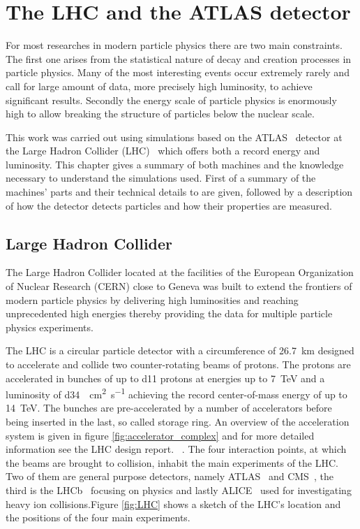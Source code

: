 

\chapter{The LHC and the ATLAS detector}
\label{lhc_atlas}


For most researches in modern particle physics there are two main constraints. The first one arises from the statistical nature of decay and creation processes in particle physics. Many of the most interesting events occur extremely rarely and call for large amount of data, more precisely high luminosity, to achieve significant results. Secondly the energy scale of particle physics is enormously high to allow breaking the structure of particles below the nuclear scale. 

This work was carried out using simulations based on the ATLAS~\cite{atlas} detector at the Large Hadron Collider (LHC)~\cite{lhc_machine} which offers both a record energy and luminosity. This chapter gives a summary of both machines and the knowledge necessary to understand the simulations used. First of a summary of the machines' parts and their technical details to are given, followed by a description of how the detector detects particles and how their properties are measured.

\section{Large Hadron Collider}

The Large Hadron Collider located at the facilities of the European Organization of Nuclear Research (CERN) close to Geneva was built to extend the frontiers of modern particle physics by delivering high luminosities and reaching unprecedented high energies thereby providing the data for multiple particle physics experiments.

The LHC is a circular particle detector with a circumference of \SI{26.7}{\kilo \metre} designed to  accelerate and collide two counter-rotating beams of protons. The protons are accelerated in bunches of up to \num{d11} protons at  energies up to \SI{7}{\tera \electronvolt} and a luminosity of \SI{d34}{\per\square\cm \per\s} achieving the record center-of-mass energy of up to \SI{14}{\tera \electronvolt}. The bunches are pre-accelerated by a number of accelerators before being inserted in the last, so called storage ring. An overview of the acceleration system is given in figure \ref{fig:accelerator_complex} and for more detailed information see the LHC design report. ~\cite{lhc_machine}. 
The four interaction points, at which the beams are brought to collision, inhabit the main experiments of the LHC. Two of them are general purpose detectors, namely ATLAS~\cite{atlas} and CMS~\cite{cms}, the third is the LHCb~\cite{lhcb} focusing on \Pbottom physics and lastly ALICE~\cite{alice} used for investigating heavy ion collisions.Figure \ref{fig:LHC} shows a sketch of the LHC's location and the positions of the four main experiments.

